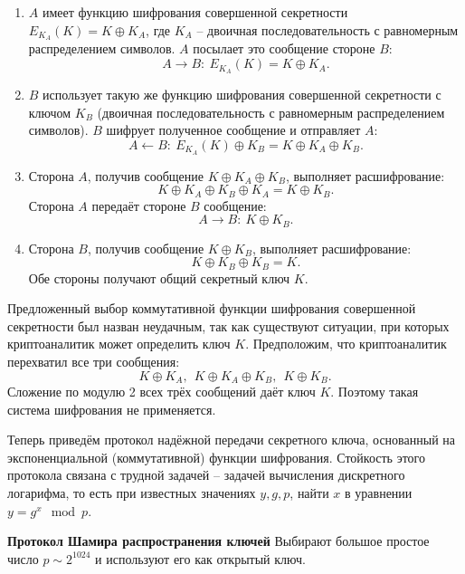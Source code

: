 \begin{enumerate}
    \item $A$ имеет функцию шифрования совершенной секретности $E_{K_A}(K) = K \oplus K_A$, где $K_A$ -- двоичная последовательность с равномерным распределением символов. $A$ посылает это сообщение стороне $B$:
            \[ A \rightarrow B: ~ E_{K_A}(K) = K \oplus K_A. \]
    \item $B$ использует такую же функцию шифрования совершенной секретности с ключом $K_B$ (двоичная последовательность с равномерным распределением символов). $B$ шифрует полученное сообщение и отправляет $A$:
            \[ A \leftarrow B: ~ E_{K_A}(K) \oplus K_B = K \oplus K_A \oplus K_B. \]
    \item Сторона $A$, получив сообщение $K \oplus K_A \oplus K_B$, выполняет расшифрование:
            \[ K \oplus K_A \oplus K_B \oplus K_A = K \oplus K_B. \]
        Сторона $A$ передаёт стороне $B$ сообщение:
            \[ A \rightarrow B: ~ K \oplus K_B. \]
    \item Сторона $B$, получив сообщение $K \oplus K_B$, выполняет расшифрование:
            \[ K \oplus K_B \oplus K_B = K. \]
        Обе стороны получают общий секретный ключ $K$.
\end{enumerate}

Предложенный выбор коммутативной функции шифрования совершенной секретности был назван неудачным, так как существуют ситуации, при которых криптоаналитик может определить ключ $K$. Предположим, что криптоаналитик перехватил все три сообщения:
    \[ K \oplus K_A, ~~ K \oplus K_A \oplus K_B, ~~ K \oplus K_B. \]
Сложение по модулю 2 всех трёх сообщений даёт ключ $K$. Поэтому такая система шифрования не применяется.

Теперь приведём протокол надёжной передачи секретного ключа, основанный на экспоненциальной (коммутативной) функции шифрования. Стойкость этого протокола связана с трудной задачей -- задачей вычисления дискретного логарифма, то есть при известных значениях $y, g, p$, найти $x$ в уравнении $y = g^x \mod p$.

\textbf{Протокол Шамира распространения ключей}
Выбирают большое простое число $p\sim 2^{1024}$ и используют его как открытый ключ.

